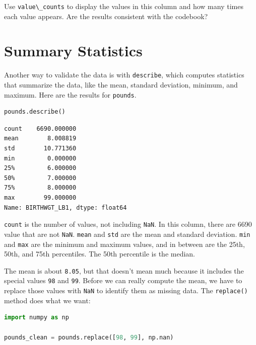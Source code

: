 Use \passthrough{\lstinline!value\_counts!} to display the values in
this column and how many times each value appears. Are the results
consistent with the codebook?

\hypertarget{summary-statistics}{%
\section{Summary Statistics}\label{summary-statistics}}

Another way to validate the data is with
\passthrough{\lstinline!describe!}, which computes statistics that
summarize the data, like the mean, standard deviation, minimum, and
maximum. Here are the results for \passthrough{\lstinline!pounds!}.

\begin{lstlisting}[language=Python,style=source]
pounds.describe()
\end{lstlisting}

\begin{lstlisting}[style=output]
count    6690.000000
mean        8.008819
std        10.771360
min         0.000000
25%         6.000000
50%         7.000000
75%         8.000000
max        99.000000
Name: BIRTHWGT_LB1, dtype: float64
\end{lstlisting}

\passthrough{\lstinline!count!} is the number of values, not including
\passthrough{\lstinline!NaN!}. In this column, there are 6690 value that
are not \passthrough{\lstinline!NaN!}. \passthrough{\lstinline!mean!}
and \passthrough{\lstinline!std!} are the mean and standard deviation.
\passthrough{\lstinline!min!} and \passthrough{\lstinline!max!} are the
minimum and maximum values, and in between are the 25th, 50th, and 75th
percentiles. The 50th percentile is the median.

The mean is about \passthrough{\lstinline!8.05!}, but that doesn't mean
much because it includes the special values \passthrough{\lstinline!98!}
and \passthrough{\lstinline!99!}. Before we can really compute the mean,
we have to replace those values with \passthrough{\lstinline!NaN!} to
identify them as missing data. The \passthrough{\lstinline!replace()!}
method does what we want:

\begin{lstlisting}[language=Python,style=source]
import numpy as np

pounds_clean = pounds.replace([98, 99], np.nan)
\end{lstlisting}

